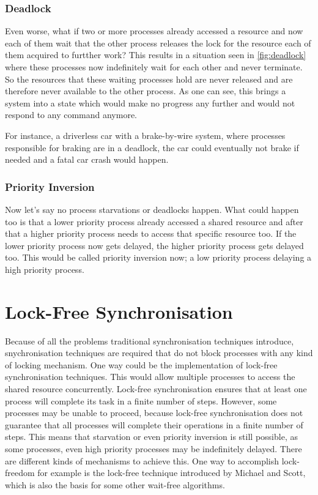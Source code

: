 \subsubsection{Deadlock}\label{subsubsec:deadlock}

Even worse, what if two or more processes already accessed a resource and now each of them wait that the other process releases the lock for the resource each of them acquired to furtther work? This results in a situation seen in \cref{fig:deadlock} where these processes now indefinitely wait for each other and never terminate. So the resources that these waiting processes hold are never released and are therefore never available to the other process. As one can see, this brings a system into a state which would make no progress any further and would not respond to any command anymore. \cite{chahar2013deadlock}

For instance, a driverless car with a brake-by-wire system, where processes responsible for braking are in a deadlock, the car could eventually not brake if needed and a fatal car crash would happen. 


\subsubsection{Priority Inversion}\label{subsubsec:priority-inversion}

Now let's say no process starvations or deadlocks happen. What could happen too is that a lower priority process already accessed a shared resource and after that a higher priority process needs to access that specific resource too. If the lower priority process now gets delayed, the higher priority process gets delayed too. This would be called priority inversion now; a low priority process delaying a high priority process. \cite{priorityInversion}

\section{Lock-Free Synchronisation}\label{sec:lock-free}

Because of all the problems traditional synchronisation techniques introduce, snychronisation techniques are required that do not block processes with any kind of locking mechanism. One way could be the implementation of lock-free synchronisation techniques. This would allow multiple processes to access the shared resource concurrently. Lock-free synchronisation ensures that at least one process will complete its task in a finite number of steps. However, some processes may be unable to proceed, because lock-free synchronisation does not guarantee that all processes will complete their operations in a finite number of steps. This means that starvation or even priority inversion is still possible, as some processes, even high priority processes may be indefinitely delayed. There are different kinds of mechanisms to achieve this. One way to accomplish lock-freedom for example is the lock-free technique introduced by Michael and Scott, which is also the basis for some other wait-free algorithms.

